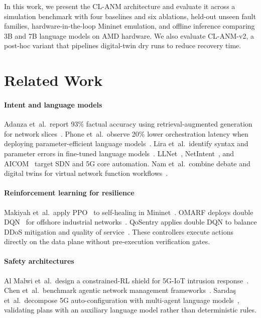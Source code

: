 \documentclass[sn-mathphys,Numbered]{sn-jnl}
\begin{document}
In this work, we present the CL-ANM architecture and evaluate it across a simulation benchmark with four baselines and six ablations, held-out unseen fault families, hardware-in-the-loop Mininet emulation, and offline inference comparing 3B and 7B language models on AMD hardware. We also evaluate CL-ANM-v2, a post-hoc variant that pipelines digital-twin dry runs to reduce recovery time.

\FloatBarrier
\section{Related Work}\label{sec:related}
\paragraph{Intent and language models} Adanza et~al.\ report 93\% factual accuracy using retrieval-augmented generation for network slices~\cite{adanza}. Phone et~al.\ observe 20\% lower orchestration latency when deploying parameter-efficient language models~\cite{phone}. Lira et~al.\ identify syntax and parameter errors in fine-tuned language models~\cite{lira}. LLNet~\cite{llnet}, NetIntent~\cite{netintent}, and AICOM~\cite{aicom} target SDN and 5G core automation. Nam et~al.\ combine debate and digital twins for virtual network function workflows~\cite{nam}.

\paragraph{Reinforcement learning for resilience} Makiyah et~al.\ apply PPO~\cite{ppo} to self-healing in Mininet~\cite{makiyah}. OMARF deploys double DQN~\cite{dqn} for offshore industrial networks~\cite{omarf}. QoSentry applies double DQN to balance DDoS mitigation and quality of service~\cite{qosentry}. These controllers execute actions directly on the data plane without pre-execution verification gates.

\paragraph{Safety architectures} Al Malwi et~al.\ design a constrained-RL shield for 5G-IoT intrusion response~\cite{safe5g}. Chen et~al.\ benchmark agentic network management frameworks~\cite{gym6g}. Sar\i{}da\c{s} et~al.\ decompose 5G auto-configuration with multi-agent language models~\cite{ragma}, validating plans with an auxiliary language model rather than deterministic rules.
\end{document}
